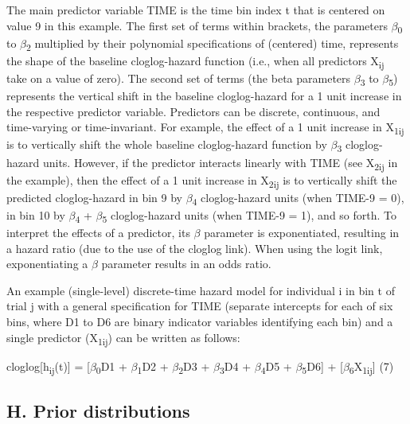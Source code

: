 \documentclass[
  english,
  man,floatsintext]{apa6}
\begin{document}
The main predictor variable TIME is the time bin index t that is centered on value 9 in this example. The first set of terms within brackets, the parameters \(\beta\)\textsubscript{0} to \(\beta\)\textsubscript{2} multiplied by their polynomial specifications of (centered) time, represents the shape of the baseline cloglog-hazard function (i.e., when all predictors X\textsubscript{ij} take on a value of zero). The second set of terms (the beta parameters \(\beta\)\textsubscript{3} to \(\beta\)\textsubscript{5}) represents the vertical shift in the baseline cloglog-hazard for a 1 unit increase in the respective predictor variable. Predictors can be discrete, continuous, and time-varying or time-invariant. For example, the effect of a 1 unit increase in X\textsubscript{1ij} is to vertically shift the whole baseline cloglog-hazard function by \(\beta\)\textsubscript{3} cloglog-hazard units. However, if the predictor interacts linearly with TIME (see X\textsubscript{2ij} in the example), then the effect of a 1 unit increase in X\textsubscript{2ij} is to vertically shift the predicted cloglog-hazard in bin 9 by \(\beta\)\textsubscript{4} cloglog-hazard units (when TIME-9 = 0), in bin 10 by \(\beta\)\textsubscript{4} + \(\beta\)\textsubscript{5} cloglog-hazard units (when TIME-9 = 1), and so forth. To interpret the effects of a predictor, its \(\beta\) parameter is exponentiated, resulting in a hazard ratio (due to the use of the cloglog link). When using the logit link, exponentiating a \(\beta\) parameter results in an odds ratio.

An example (single-level) discrete-time hazard model for individual i in bin t of trial j with a general specification for TIME (separate intercepts for each of six bins, where D1 to D6 are binary indicator variables identifying each bin) and a single predictor (X\textsubscript{1ij}) can be written as follows:

\noindent cloglog{[}h\textsubscript{ij}(t){]} = {[}\(\beta\)\textsubscript{0}D1 + \(\beta\)\textsubscript{1}D2 + \(\beta\)\textsubscript{2}D3 + \(\beta\)\textsubscript{3}D4 + \(\beta\)\textsubscript{4}D5 + \(\beta\)\textsubscript{5}D6{]} + {[}\(\beta\)\textsubscript{6}X\textsubscript{1ij}{]} \hfill  (7)

\subsection{H. Prior distributions}\label{h.-prior-distributions}
\end{document}
